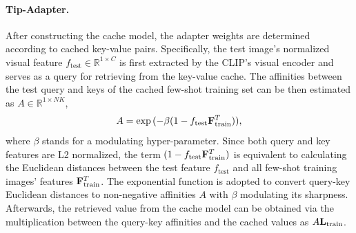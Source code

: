 \documentclass[10pt,twocolumn,letterpaper]{article}
\begin{document}
\paragraph{Tip-Adapter.}
After constructing the cache model, the adapter weights are determined according to cached key-value pairs.
Specifically, the test image's normalized visual feature $f_\mathrm{test} \in \mathbb{R}^{1 \times C}$ is first extracted by the CLIP's visual encoder and serves as a query for retrieving from the key-value cache. The affinities between the test query and keys of the cached few-shot training set can be then estimated as $A \in \mathbb{R}^{1 \times NK}$,
\begin{align}
\label{beta}
    A 
       =  \exp{(-\beta(1 - f_\mathrm{test} \mathbf{F}^T_{\rm train}))},
\end{align}
where $\beta$ stands for a modulating hyper-parameter. Since both query and key features are L2 normalized, the term $(1-f_\mathrm{test} \mathbf{F}^T_{\rm train})$ is equivalent to calculating the Euclidean distances between the test feature $f_\mathrm{test}$ and all few-shot training images' features $\mathbf{F}^T_{\rm train}$. 
The exponential function is adopted to convert query-key Euclidean distances to non-negative affinities $A$ with $\beta$ modulating its sharpness. 
Afterwards, the retrieved value from the cache model can be obtained via the multiplication between the query-key affinities and the cached values as $A \mathbf{L}_{\rm train}$.

\end{document}

